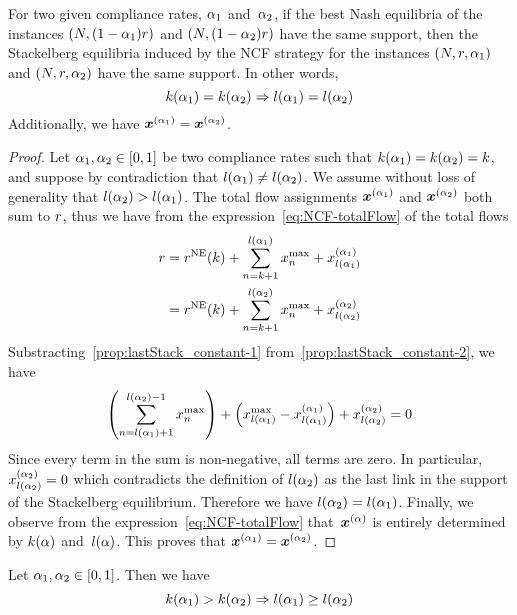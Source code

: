 \begin{proposition}
\label{prop:lastStack_constant}
For two given compliance rates, $\alpha_1$ and~$\alpha_2$, if the best Nash equilibria of the instances ${ (N,(1-\alpha_1)r) }$ and ${ (N, (1-\alpha_2)r) }$ have the same support, then the Stackelberg equilibria induced by the NCF strategy for the instances $(N, r, \alpha_1)$ and $(N, r, \alpha_2)$ have the same support. In other words,
\[
k(\alpha_1) = k(\alpha_2) \Rightarrow l(\alpha_1)=l(\alpha_2)
\]
Additionally, we have $\boldsymbol {x}^{(\alpha_1)} = \boldsymbol {x}^{(\alpha_2)}$.
\end{proposition}

\begin{proof}
Let $\alpha_1, \alpha_2 \in [0,1]$ be two compliance rates such that $k(\alpha_1) = k(\alpha_2) = k$, and suppose by contradiction that $l(\alpha_1) \neq l(\alpha_2)$. We assume without loss of generality that $l(\alpha_2) > l(\alpha_1)$. The total flow assignments $\boldsymbol {x}^{(\alpha_1)}$ and $\boldsymbol {x}^{(\alpha_2)}$ both sum to $r$, thus we have from the expression~\eqref{eq:NCF-totalFlow} of the total flows
\begin{align}
r & = r^{\textup{NE}} ( k ) + \sum_{n=k+1}^{l(\alpha_1)} x^{\max}_n + x^{(\alpha_1)}_{l(\alpha_1)} \label{prop:lastStack_constant-1}\\
 &= r^{\textup{NE}} ( k ) + \sum_{n = k+1}^{l(\alpha_2)} x^{\max}_n + x^{(\alpha_2)}_{l(\alpha_2)} \label{prop:lastStack_constant-2}
\end{align}
Substracting~\eqref{prop:lastStack_constant-1} from~\eqref{prop:lastStack_constant-2}, we have
\[
\left( \sum_{n = l(\alpha_1)+1}^{l(\alpha_2)-1} x^{\max}_n \right) + \left( x^{\max}_{l(\alpha_1)} - x^{(\alpha_1)}_{l(\alpha_1)} \right) + x^{(\alpha_2)}_{l(\alpha_2)} = 0
\]
Since every term in the sum is non-negative, all terms are zero. In particular, $x^{(\alpha_2)}_{l(\alpha_2)} = 0$ which contradicts the definition of $l(\alpha_2)$ as the last link in the support of the Stackelberg equilibrium.
Therefore we have $l(\alpha_2) = l(\alpha_1)$. Finally, we observe from the expression~\eqref{eq:NCF-totalFlow} that~$\boldsymbol {x}^{(\alpha)}$ is entirely determined by $k(\alpha)$ and~$l(\alpha)$. This proves that $\boldsymbol {x}^{(\alpha_1)} = \boldsymbol {x}^{(\alpha_2)}$.
\end{proof}



\begin{proposition}
\label{prop:lastStack}
Let $\alpha_1, \alpha_2 \in [0,1]$. Then we have
\[
k(\alpha_1) > k(\alpha_2) \Rightarrow l(\alpha_1) \geq l(\alpha_2)
\]
\end{proposition}

